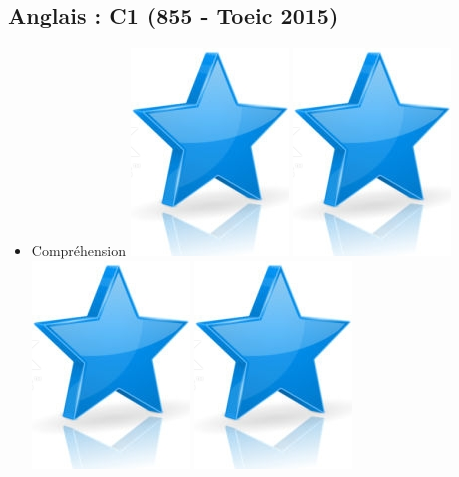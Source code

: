 \documentclass[10pt,a4paper,sans]{article}
\begin{document}
\begin{minipage}[t]{0.28\textwidth}
\begin{mdframed}[style=cadreCompetences]
        \subsection{Anglais : C1 \newline (855 - Toeic 2015)}
            \begin{itemize}
                \item{Compréhension
                    \hfill
                    \includegraphics[scale=0.20]{img/star.png} \hspace{-0.2cm}
                    \includegraphics[scale=0.20]{img/star.png} \hspace{-0.2cm}
                    \includegraphics[scale=0.20]{img/star.png} \hspace{-0.2cm}
                    \includegraphics[scale=0.20]{img/star.png} \hspace{-0.2cm}
}
\end{itemize}
\end{mdframed}
\end{minipage}
\end{document}
